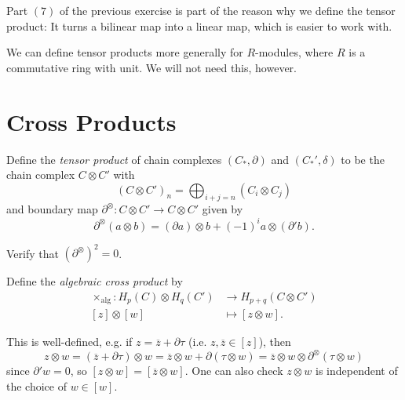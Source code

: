 \begin{remark}
  Part $(7)$ of the previous exercise is
  part of the reason why we define the tensor
  product: It turns a bilinear map into a linear
  map, which is easier to work with.
\end{remark}

\begin{remark}
  We can define tensor products more generally
  for $R$-modules, where $R$ is a
  commutative ring with unit. We will not
  need this, however.
\end{remark}

\section{Cross Products}
\begin{definition}
  Define the \emph{tensor product} of
  chain complexes $(C_*, \partial)$ and
  $(C_*', \delta)$ to be the chain complex
  $C \otimes C'$ with
  \[
    (C \otimes C')_n = \bigoplus_{i + j = n} (C_i \otimes C_j)
  \]
  and boundary map $\partial^\otimes : C \otimes C' \to C \otimes C'$
  given by
  \[
    \partial^\otimes(a \otimes b)
    = (\partial a) \otimes b + (-1)^i a \otimes (\partial' b).
  \]
\end{definition}

\begin{exercise}
  Verify that $(\partial^\otimes)^2 = 0$.
\end{exercise}

\begin{definition}
  Define the \emph{algebraic cross product} by
  \begin{align*}
    \times_{\mathrm{alg}} : H_p(C) \otimes H_q(C')
    &\longrightarrow H_{p + q}(C \otimes C') \\
    [z] \otimes [w] &\longmapsto [z \otimes w].
  \end{align*}
\end{definition}

\begin{remark}
  This is well-defined, e.g. if
  $z = \overline{z} + \partial \tau$ (i.e.
  $z, \overline{z} \in [z]$), then
  \[
    z \otimes w = (\overline{z} + \partial \tau) \otimes w
    = \overline{z} \otimes w + \partial(\tau \otimes w)
    = \overline{z} \otimes w \otimes \partial^\otimes(\tau \otimes w)
  \]
  since $\partial' w = 0$, so
  $[z \otimes w] = [\overline{z} \otimes w]$.
  One can also check $z \otimes w$ is
  independent of the choice of
  $w \in [w]$.
\end{remark}


